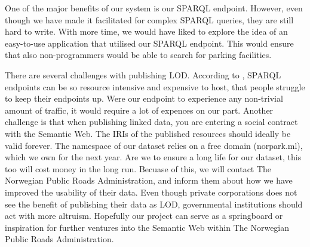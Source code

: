 \vspace{5mm}

One of the major benefits of our system is our SPARQL endpoint. However, even though we have made it facilitated for complex SPARQL queries, they are still hard to write. With more time, we would have liked to explore the idea of an easy-to-use application that utilised our SPARQL endpoint. This would ensure that also non-programmers would be able to search for parking facilities.

\vspace{5mm}

There are several challenges with publishing LOD. According to \cite{can-i-sparql-your-endpoint}, SPARQL endpoints can be so resource intensive and expensive to host, that people struggle to keep their endpoints up. Were our endpoint to experience any non-trivial amount of traffic, it would require a lot of expences on our part. Another challenge is that when publishing linked data, you are entering a social contract with the Semantic Web. The IRIs of the published resources should ideally be valid forever. The namespace of our dataset relies on a free domain (norpark.ml), which we own for the next year. Are we to ensure a long life for our dataset, this too will cost money in the long run. Becuase of this, we will contact The Norwegian Public Roads Administration, and inform them about how we have improved the usability of their data. Even though private corporations does not see the benefit of publishing their data as LOD, governmental institutions should act with more altruism. Hopefully our project can serve as a springboard or inspiration for further ventures into the Semantic Web within The Norwegian Public Roads Administration.


